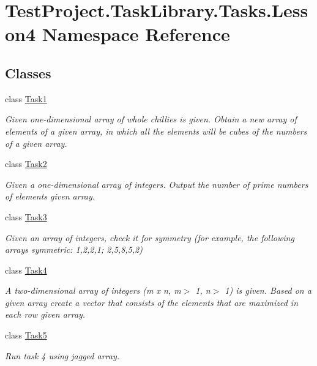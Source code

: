 \hypertarget{namespace_test_project_1_1_task_library_1_1_tasks_1_1_lesson4}{}\section{Test\+Project.\+Task\+Library.\+Tasks.\+Lesson4 Namespace Reference}
\label{namespace_test_project_1_1_task_library_1_1_tasks_1_1_lesson4}
\subsection*{Classes}
\begin{DoxyCompactItemize}
\item 
class \mbox{\hyperlink{class_test_project_1_1_task_library_1_1_tasks_1_1_lesson4_1_1_task1}{Task1}}
\begin{DoxyCompactList}\small\item\em Given one-\/dimensional array of whole chillies is given. Obtain a new array of elements of a given array, in which all the elements will be cubes of the numbers of a given array. \end{DoxyCompactList}\item 
class \mbox{\hyperlink{class_test_project_1_1_task_library_1_1_tasks_1_1_lesson4_1_1_task2}{Task2}}
\begin{DoxyCompactList}\small\item\em Given a one-\/dimensional array of integers. Output the number of prime numbers of elements given array. \end{DoxyCompactList}\item 
class \mbox{\hyperlink{class_test_project_1_1_task_library_1_1_tasks_1_1_lesson4_1_1_task3}{Task3}}
\begin{DoxyCompactList}\small\item\em Given an array of integers, check it for symmetry (for example, the following arrays symmetric\+: 1,2,2,1; 2,5,8,5,2) \end{DoxyCompactList}\item 
class \mbox{\hyperlink{class_test_project_1_1_task_library_1_1_tasks_1_1_lesson4_1_1_task4}{Task4}}
\begin{DoxyCompactList}\small\item\em A two-\/dimensional array of integers (m x n, m$>$ 1, n$>$ 1) is given. Based on a given array create a vector that consists of the elements that are maximized in each row given array. \end{DoxyCompactList}\item 
class \mbox{\hyperlink{class_test_project_1_1_task_library_1_1_tasks_1_1_lesson4_1_1_task5}{Task5}}
\begin{DoxyCompactList}\small\item\em Run task 4 using jagged array. \end{DoxyCompactList}\end{DoxyCompactItemize}
